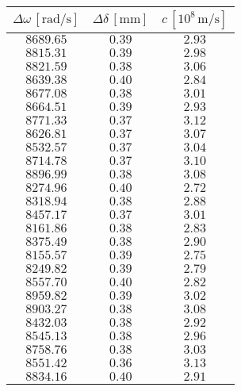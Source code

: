 \documentclass[]{article}
\begin{document}
    \begin{table}
        \centering
        \begin{tabular}{||c|c|c||}
            \hline
            $\Delta \omega \,[\text{rad/s}]$ & $\Delta \delta \,[\text{mm}]$ & $c \,[10^8 \,\text{m/s}]$ \\
            \hline\hline
            $8689.65$ & $0.39$ & $2.93$ \\\hline
            $8815.31$ & $0.39$ & $2.98$ \\\hline
            $8821.59$ & $0.38$ & $3.06$ \\\hline
            $8639.38$ & $0.40$ & $2.84$ \\\hline
            $8677.08$ & $0.38$ & $3.01$ \\\hline
            $8664.51$ & $0.39$ & $2.93$ \\\hline
            $8771.33$ & $0.37$ & $3.12$ \\\hline
            $8626.81$ & $0.37$ & $3.07$ \\\hline
            $8532.57$ & $0.37$ & $3.04$ \\\hline
            $8714.78$ & $0.37$ & $3.10$ \\\hline
            $8896.99$ & $0.38$ & $3.08$ \\\hline
            $8274.96$ & $0.40$ & $2.72$ \\\hline
            $8318.94$ & $0.38$ & $2.88$ \\\hline
            $8457.17$ & $0.37$ & $3.01$ \\\hline
            $8161.86$ & $0.38$ & $2.83$ \\\hline
            $8375.49$ & $0.38$ & $2.90$ \\\hline
            $8155.57$ & $0.39$ & $2.75$ \\\hline
            $8249.82$ & $0.39$ & $2.79$ \\\hline
            $8557.70$ & $0.40$ & $2.82$ \\\hline
            $8959.82$ & $0.39$ & $3.02$ \\\hline
            $8903.27$ & $0.38$ & $3.08$ \\\hline
            $8432.03$ & $0.38$ & $2.92$ \\\hline
            $8545.13$ & $0.38$ & $2.96$ \\\hline
            $8758.76$ & $0.38$ & $3.03$ \\\hline
            $8551.42$ & $0.36$ & $3.13$ \\\hline
            $8834.16$ & $0.40$ & $2.91$ \\\hline

\end{tabular}
\end{table}
\end{document}

